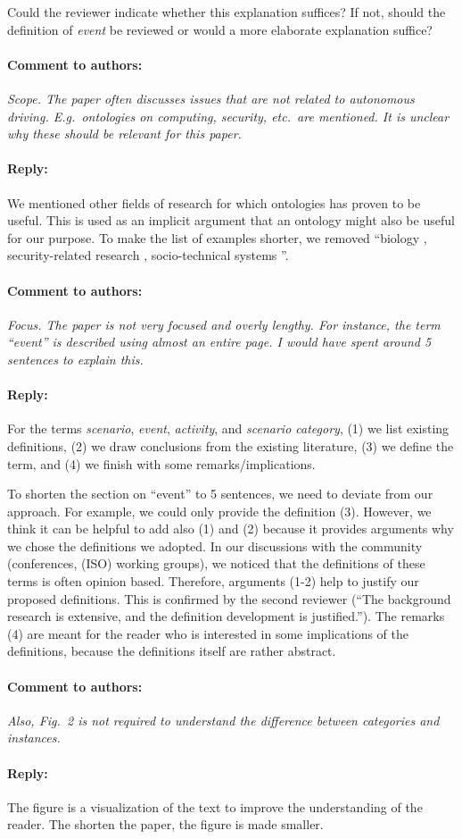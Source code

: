 \documentclass[10pt,final,a4paper,oneside,onecolumn]{article}
\renewcommand{\cite}[1]{\parencite{#1}}
\newcommand{\toauthor}{\paragraph*{Comment to authors:} \itshape}
\newcommand{\fromauthor}{\paragraph*{Reply:} \normalfont}
\begin{document}
Could the reviewer indicate whether this explanation suffices? If not, should the definition of \emph{event} be reviewed or would a more elaborate explanation suffice?

\toauthor Scope. The paper often discusses issues that are not related to autonomous driving. E.g.\ ontologies on computing, security, etc.\ are mentioned. It is unclear why these should be relevant for this paper.

\fromauthor We mentioned other fields of research for which ontologies has proven to be useful. This is used as an implicit argument that an ontology might also be useful for our purpose. To make the list of examples shorter, we removed ``biology \cite{gkoutos2004mouse}, security-related research \cite{kim2005security}, socio-technical systems \cite{vanDamPhDThesis2009}''.

\toauthor Focus. The paper is not very focused and overly lengthy. For instance, the term ``event'' is described using almost an entire page. I would have spent around 5 sentences to explain this.  

\fromauthor For the terms \emph{scenario}, \emph{event}, \emph{activity}, and \emph{scenario category}, (1) we list existing definitions, (2) we draw conclusions from the existing literature, (3) we define the term, and (4) we finish with some remarks/implications. 

To shorten the section on ``event'' to 5 sentences, we need to deviate from our approach. For example, we could only provide the definition (3). However, we think it can be helpful to add also (1) and (2) because it provides arguments why we chose the definitions we adopted. In our discussions with the community (conferences, (ISO) working groups), we noticed that the definitions of these terms is often opinion based. Therefore, arguments (1-2) help to justify our proposed definitions. This is confirmed by the second reviewer (``The background research is extensive, and the definition development is justified.''). The remarks (4) are meant for the reader who is interested in some implications of the definitions, because the definitions itself are rather abstract. 

\toauthor Also, Fig.~2 is not required to understand the difference between categories and instances. 

\fromauthor The figure is a visualization of the text to improve the understanding of the reader. The shorten the paper, the figure is made smaller.
\end{document}
